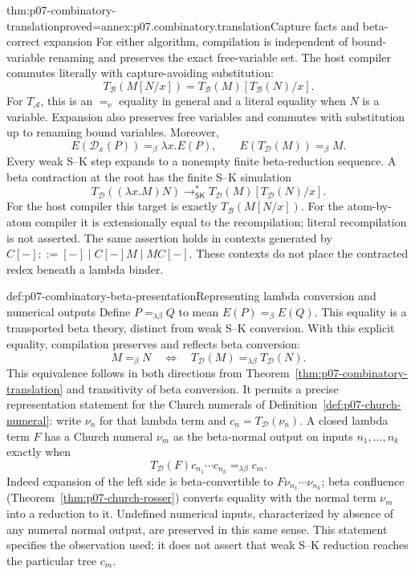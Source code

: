 \begin{hbtheorem}{thm:p07-combinatory-translation}{proved=annex:p07.combinatory.translation}{Capture facts and beta-correct expansion}
For either algorithm, compilation is independent of bound-variable renaming
and preserves the exact free-variable set.  The host compiler commutes
literally with capture-avoiding substitution:
\[
 T_{\mathcal B}(M[N/x])=
 T_{\mathcal B}(M)[T_{\mathcal B}(N)/x].
\]
For \(T_{\mathcal A}\), this is an \(=_{\mathrm e}\) equality in general
and a literal equality when \(N\) is a variable.
Expansion also preserves free variables and commutes with substitution up to
renaming bound variables.  Moreover,
\[
 E(\mathcal D_x(P))=_\beta\lambda x.E(P),\qquad
 E(T_{\mathcal D}(M))=_\beta M.
\]
Every weak S--K step expands to a nonempty finite beta-reduction sequence.
A beta contraction at the root has the finite S--K simulation
\[
 T_{\mathcal D}((\lambda x.M)N)
 \longrightarrow_{\mathsf{SK}}^*
 T_{\mathcal D}(M)[T_{\mathcal D}(N)/x].
\]
For the host compiler this target is exactly \(T_{\mathcal B}(M[N/x])\).
For the atom-by-atom compiler it is extensionally equal to the recompilation;
literal recompilation is not asserted.
The same assertion holds in contexts generated by
\(C[-]::=[-]\mid C[-]M\mid M C[-]\).
These contexts do not place the contracted redex beneath a lambda binder.
\end{hbtheorem}

\begin{hbdefinition}{def:p07-combinatory-beta-presentation}{Representing lambda conversion and numerical outputs}
Define \(P=_{\lambda\beta}Q\) to mean \(E(P)=_\beta E(Q)\).
This equality is a transported beta theory, distinct from weak S--K conversion.
With this explicit equality, compilation preserves and reflects beta conversion:
\[
 M=_\beta N\quad\Longleftrightarrow\quad
 T_{\mathcal D}(M)=_{\lambda\beta}T_{\mathcal D}(N).
\]
This equivalence follows in both directions from
Theorem~\ref{thm:p07-combinatory-translation} and transitivity of beta conversion.
It permits a precise representation statement for the Church numerals of
Definition~\ref{def:p07-church-numeral}: write \(\nu_n\) for that lambda term
and \(c_n=T_{\mathcal D}(\nu_n)\).  A closed lambda term \(F\) has a Church
numeral \(\nu_m\) as the beta-normal output on inputs \(n_1,\ldots,n_k\)
exactly when
\[
 T_{\mathcal D}(F)c_{n_1}\cdots c_{n_k}
       =_{\lambda\beta}c_m.
\]
Indeed expansion of the left side is beta-convertible to
\(F\nu_{n_1}\cdots\nu_{n_k}\); beta confluence
(Theorem~\ref{thm:p07-church-rosser}) converts equality with the normal term
\(\nu_m\) into a reduction to it.  Undefined numerical inputs, characterized
by absence of any numeral normal output, are preserved in this same sense.
This statement specifies the observation used; it does not assert that weak
S--K reduction reaches the particular tree \(c_m\).
\end{hbdefinition}

